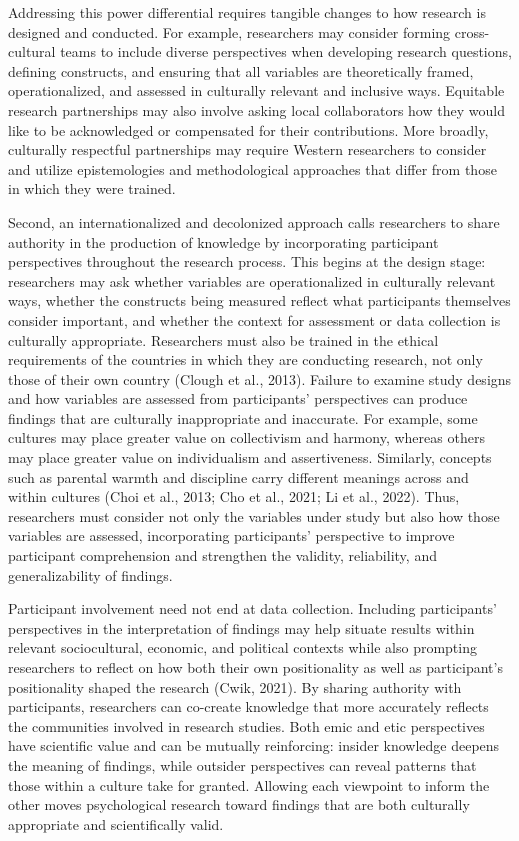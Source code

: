 \documentclass[
  11pt,
]{book}
\begin{document}
Addressing this power differential requires tangible changes to how research is designed and conducted. For example, researchers may consider forming cross-cultural teams to include diverse perspectives when developing research questions, defining constructs, and ensuring that all variables are theoretically framed, operationalized, and assessed in culturally relevant and inclusive ways. Equitable research partnerships may also involve asking local collaborators how they would like to be acknowledged or compensated for their contributions. More broadly, culturally respectful partnerships may require Western researchers to consider and utilize epistemologies and methodological approaches that differ from those in which they were trained.

Second, an internationalized and decolonized approach calls researchers to share authority in the production of knowledge by incorporating participant perspectives throughout the research process. This begins at the design stage: researchers may ask whether variables are operationalized in culturally relevant ways, whether the constructs being measured reflect what participants themselves consider important, and whether the context for assessment or data collection is culturally appropriate. Researchers must also be trained in the ethical requirements of the countries in which they are conducting research, not only those of their own country (Clough et al., 2013). Failure to examine study designs and how variables are assessed from participants' perspectives can produce findings that are culturally inappropriate and inaccurate. For example, some cultures may place greater value on collectivism and harmony, whereas others may place greater value on individualism and assertiveness. Similarly, concepts such as parental warmth and discipline carry different meanings across and within cultures (Choi et al., 2013; Cho et al., 2021; Li et al., 2022). Thus, researchers must consider not only the variables under study but also how those variables are assessed, incorporating participants' perspective to improve participant comprehension and strengthen the validity, reliability, and generalizability of findings.

Participant involvement need not end at data collection. Including participants' perspectives in the interpretation of findings may help situate results within relevant sociocultural, economic, and political contexts while also prompting researchers to reflect on how both their own positionality as well as participant's positionality shaped the research (Cwik, 2021). By sharing authority with participants, researchers can co-create knowledge that more accurately reflects the communities involved in research studies. Both emic and etic perspectives have scientific value and can be mutually reinforcing: insider knowledge deepens the meaning of findings, while outsider perspectives can reveal patterns that those within a culture take for granted. Allowing each viewpoint to inform the other moves psychological research toward findings that are both culturally appropriate and scientifically valid.
\end{document}
